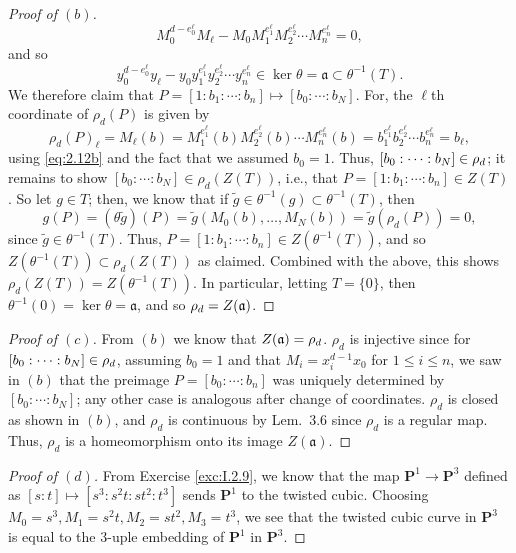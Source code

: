 \documentclass[10pt]{article}
\theoremstyle{definition}
\theoremstyle{remark}
\numberwithin{equation}{section}
\numberwithin{figure}{subsubsection}
\let\Im\relax
\DeclareMathOperator{\Im}{im}
\newcommand{\PP}{\mathbf{P}}
\begin{document}
\begin{proof}[Proof of $(b)$]
\begin{equation*}
    M_0^{d-e^\ell_0}M_\ell - M_0M_1^{e^\ell_1}M_2^{e^\ell_2}\cdots
    M_n^{e^\ell_n} = 0,
  \end{equation*}
  and so
  \begin{equation}\label{eq:2.12b}
    y_0^{d-e^\ell_0}y_\ell - y_0y_1^{e^\ell_1}y_2^{e^\ell_2}\cdots
    y_n^{e^\ell_n} \in \ker\theta = \mathfrak{a} \subset \theta^{-1}(T).
  \end{equation}
  We therefore claim that $P = [1 : b_1 : \cdots : b_n] \mapsto [b_0:\cdots:b_N]$.
  For, the $\ell$th coordinate of $\rho_d(P)$ is given by
  \begin{equation*}
    \rho_d(P)_\ell = M_\ell(b) = M_1^{e^\ell_1}(b)M_2^{e^\ell_2}(b) \cdots
    M_n^{e^\ell_n}(b) = b_1^{e^\ell_1}b_2^{e^\ell_2} \cdots b_n^{e^\ell_n} =
    b_\ell,
  \end{equation*}
  using \eqref{eq:2.12b} and the fact that we assumed $b_0 = 1$. Thus, $[b_0 :
  \cdots : b_N] \in \Im\rho_d$; it remains to show $[b_0 : \cdots : b_N] \in
  \rho_d(Z(T))$, i.e., that $P = [1 : b_1 : \cdots : b_n] \in Z(T)$. So let
  $g \in T$; then, we know that if $\tilde{g} \in \theta^{-1}(g) \subset
  \theta^{-1}(T)$, then
  \begin{equation*}
    g(P) = (\theta\tilde{g})(P) = \tilde{g}(M_0(b),\ldots,M_N(b)) =
    \tilde{g}(\rho_d(P)) = 0,
  \end{equation*}
  since $\tilde{g} \in \theta^{-1}(T)$. Thus, $P = [1 : b_1 : \cdots : b_n] \in
  Z(\theta^{-1}(T))$, and so $Z(\theta^{-1}(T)) \subset \rho_d(Z(T))$ as
  claimed. Combined with the above, this shows $\rho_d(Z(T)) =
  Z(\theta^{-1}(T))$. In particular, letting $T = \{0\}$, then $\theta^{-1}(0) =
  \ker\theta = \mathfrak{a}$, and so $\Im \rho_d = Z(\mathfrak{a})$.
\end{proof}
\begin{proof}[Proof of $(c)$]
  From $(b)$ we know that $Z(\mathfrak{a}) = \Im \rho_d$.
  $\rho_d$ is injective since for $[b_0:\cdots:b_N] \in \Im\rho_d$,
  assuming $b_0 = 1$ and that $M_i = x_i^{d-1}x_0$ for $1 \le i \le n$, we saw in
  $(b)$ that the preimage $P = [b_0:\cdots:b_n]$ was uniquely determined by
  $[b_0:\cdots:b_N]$; any other case is analogous after change of coordinates.
  $\rho_d$ is closed as shown in $(b)$, and $\rho_d$ is continuous by Lem.~$3.6$
  since $\rho_d$ is a regular map. Thus, $\rho_d$ is a homeomorphism onto its
  image $Z(\mathfrak{a})$.
\end{proof}
\begin{proof}[Proof of $(d)$]
  From Exercise \ref{exc:I.2.9}, we know that the map $\PP^1 \to \PP^3$ defined as
  $[s:t] \mapsto [s^3: s^2t: st^2: t^3]$ sends $\PP^1$ to the twisted cubic.
  Choosing $M_0 = s^3, M_1 = s^2t, M_2 = st^2, M_3 = t^3$, we see that the twisted
  cubic curve in $\PP^3$ is equal to the $3$-uple embedding of $\PP^1$ in $\PP^3$. 
\end{proof}
\end{document}
